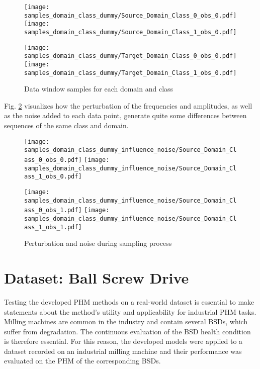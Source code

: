 \begin{figure}[H]
  \centering
  \texttt{[image: samples\_domain\_class\_dummy/Source\_Domain\_Class\_0\_obs\_0.pdf]}
  \hspace{.3cm}
  \texttt{[image: samples\_domain\_class\_dummy/Source\_Domain\_Class\_1\_obs\_0.pdf]}

  \vspace{.3cm}

  \texttt{[image: samples\_domain\_class\_dummy/Target\_Domain\_Class\_0\_obs\_0.pdf]}
  \hspace{.3cm}
  \texttt{[image: samples\_domain\_class\_dummy/Target\_Domain\_Class\_1\_obs\_0.pdf]}

  \caption{Data window samples for each domain and class}
  \label{fig:samples_domain_class_dummy}
\end{figure}

Fig. \ref{fig:samples_domain_class_dummy_influence_noise} visualizes how the perturbation of the frequencies and amplitudes, as well as the noise added to each data point, generate quite some differences between sequences of the same class and domain.

\begin{figure}[H]
  \centering
  \texttt{[image: samples\_domain\_class\_dummy\_influence\_noise/Source\_Domain\_Class\_0\_obs\_0.pdf]}
  \hspace{.3cm}
  \texttt{[image: samples\_domain\_class\_dummy\_influence\_noise/Source\_Domain\_Class\_1\_obs\_0.pdf]}

  \vspace{.3cm}

  \texttt{[image: samples\_domain\_class\_dummy\_influence\_noise/Source\_Domain\_Class\_0\_obs\_1.pdf]}
  \hspace{.3cm}
  \texttt{[image: samples\_domain\_class\_dummy\_influence\_noise/Source\_Domain\_Class\_1\_obs\_1.pdf]}

  \caption{Perturbation and noise during sampling process}
  \label{fig:samples_domain_class_dummy_influence_noise}
\end{figure}

\section{Dataset: Ball Screw Drive}
Testing the developed PHM methods on a real-world dataset is essential to make statements about the method's utility and applicability for industrial PHM tasks. Milling machines are common in the industry and contain several BSDs, which suffer from degradation. The continuous evaluation of the BSD health condition is therefore essential. For this reason, the developed models were applied to a dataset recorded on an industrial milling machine and their performance was evaluated on the PHM of the corresponding BSDs.

